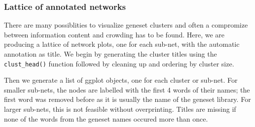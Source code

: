 \documentclass[9pt,a4paper,]{extarticle}
\newenvironment{Shaded}{\begin{snugshade}}{\end{snugshade}}
\newcommand{\KeywordTok}[1]{\textcolor[rgb]{0.13,0.29,0.53}{\textbf{#1}}}
\newcommand{\DataTypeTok}[1]{\textcolor[rgb]{0.13,0.29,0.53}{#1}}
\newcommand{\StringTok}[1]{\textcolor[rgb]{0.31,0.60,0.02}{#1}}
\newcommand{\CommentTok}[1]{\textcolor[rgb]{0.56,0.35,0.01}{\textit{#1}}}
\newcommand{\OperatorTok}[1]{\textcolor[rgb]{0.81,0.36,0.00}{\textbf{#1}}}
\newcommand{\NormalTok}[1]{#1}
\begin{document}
\subsubsection{Lattice of annotated networks}\label{lattice-of-annotated-networks}

There are many possiblities to visualize geneset clusters and often a compromize between information content and crowding has to be found. Here, we are producing a lattice of network plots, one for each sub-net, with the automatic annotation as title. We begin by generating the cluster titles using the \texttt{clust\_head()} function followed by cleaning up and ordering by cluster size.

\begin{Shaded}
\end{Shaded}

Then we generate a list of ggplot objects, one for each cluster or sub-net. For smaller sub-nets, the nodes are labelled with the first 4 words of their names; the first word was removed before as it is usually the name of the geneset library. For larger sub-nets, this is not feasible without overprinting. Titles are missing if none of the words from the geneset names occured more than once.
\end{document}

